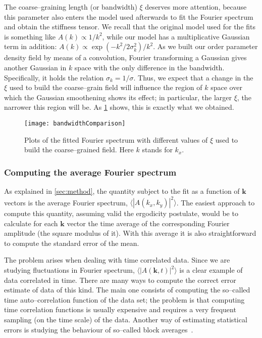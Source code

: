 The coarse--graining length (or bandwidth) $\xi$ deserves more attention, because this parameter also enters the model used afterwards to fit the Fourier spectrum and obtain the stiffness tensor.
We recall that the original model used for the fits is something like $A(k) \propto 1/k^2$, while our model has a multiplicative Gaussian term in addition: $A(k) \propto \exp{(-k^2/2\sigma_k^2)}/k^2$. As we built our order parameter density field by means of a convolution, Fourier transforming a Gaussian gives another Gaussian in $k$ space with the only difference in the bandwidth. Specifically, it holds the relation $\sigma_k = 1/\sigma$. Thus, we expect that a change in the $\xi$ used to build the coarse--grain field will influence the region of $k$ space over which the Gaussian smoothening shows its effect; in particular, the larger $\xi$, the narrower this region will be. As \cref{fig:bandwidths} shows, this is exactly what we obtained.
\begin{figure}[tb]
    \centering
    \texttt{[image: bandwidthComparison]}
    \caption{Plots of the fitted Fourier spectrum with different values of $\xi$ used to build the coarse--grained field. Here $k$ stands for $k_x$.}
    \label{fig:bandwidths}
\end{figure}


\subsubsection{Computing the average Fourier spectrum}
As explained in \cref{sec:method}, the quantity subject to the fit as a function of $\bm{k}$ vectors is the average Fourier spectrum, $\langle |A(k_x,k_y)|^2 \rangle$. The easiest approach to compute this quantity, assuming valid the ergodicity postulate, would be to calculate for each $\bm{k}$ vector the time average of the corresponding Fourier amplitude (the square modulus of it). With this average it is also straightforward to compute the standard error of the mean.

The problem arises when dealing with time correlated data. Since we are studying fluctuations in Fourier spectrum, $\langle |A(\bm{k},t)|^2 \rangle$ is a clear example of data correlated in time. There are many ways to compute the correct error estimate of data of this kind. The main one consists of computing the so--called time auto--correlation function of the data set; the problem is that computing time correlation functions is usually expensive and requires a very frequent sampling (on the time scale) of the data. Another way of estimating statistical errors is studying the behaviour of so--called block averages~\cite{FrenkelSmitMD}.

